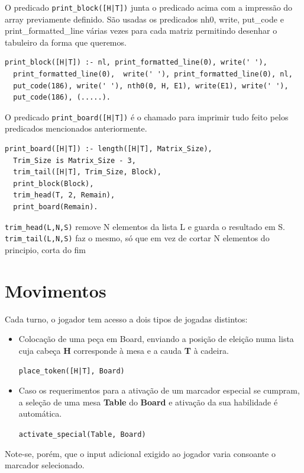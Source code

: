 \documentclass[a4paper]{article}
\begin{document}
O predicado \texttt{print\_block([H|T])} junta o predicado acima com a impressão do array previamente definido. São usadas os predicados nh0, write, put\_code e print\_formatted\_line várias vezes para cada matriz permitindo desenhar o tabuleiro da forma que queremos.

\begin {lstlisting}
print_block([H|T]) :- nl, print_formatted_line(0), write(' '), 
  print_formatted_line(0),  write(' '), print_formatted_line(0), nl, 
  put_code(186), write(' '), nth0(0, H, E1), write(E1), write(' '), 
  put_code(186), (.....).
\end{lstlisting}

O predicado \texttt{print\_board([H|T])} é o chamado para imprimir tudo feito pelos predicados mencionados anteriormente.

\begin{lstlisting}
print_board([H|T]) :- length([H|T], Matrix_Size),
  Trim_Size is Matrix_Size - 3,
  trim_tail([H|T], Trim_Size, Block),
  print_block(Block),
  trim_head(T, 2, Remain),
  print_board(Remain).
\end{lstlisting}

\texttt{trim\_head(L,N,S)} remove N elementos da lista L e guarda o resultado em S. \texttt{trim\_tail(L,N,S)} faz o mesmo, só que em vez de cortar N elementos do principio, corta do fim


\newpage
\section{Movimentos}

Cada turno, o jogador tem acesso a dois tipos de jogadas distintos:

\begin{itemize}
\item Colocação de uma peça em Board, enviando a posição de eleição numa lista cuja cabeça \textbf{H} corresponde à mesa e a cauda \textbf{T} à cadeira.

\texttt{place\_token([H|T], Board)}

\item Caso os requerimentos para a ativação de um marcador especial se cumpram, a seleção de uma mesa \textbf{Table} do \textbf{Board} e ativação da sua habilidade é automática.

\texttt{activate\_special(Table, Board)}
\end{itemize}

Note-se, porém, que o input adicional exigido ao jogador varia consoante o marcador selecionado. \newline
\end{document}
